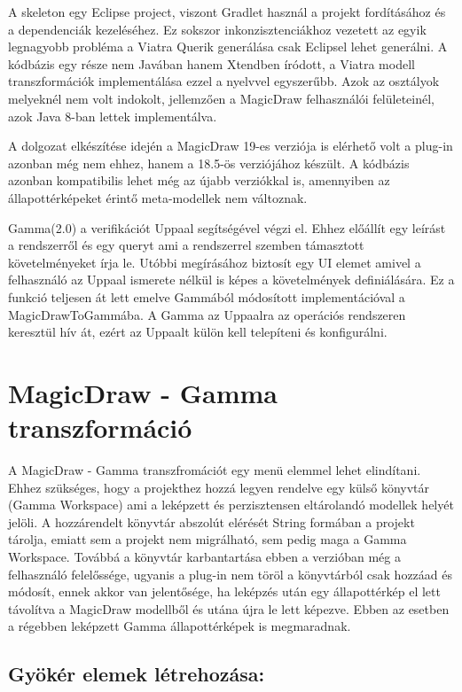 A skeleton egy Eclipse project, viszont Gradlet használ a projekt fordításához és a dependenciák kezeléséhez. Ez sokszor inkonzisztenciákhoz vezetett az egyik legnagyobb probléma a Viatra Querik generálása csak Eclipsel lehet generálni. A kódbázis egy része nem Javában hanem Xtendben íródott, a Viatra modell transzformációk implementálása ezzel a nyelvvel egyszerűbb. Azok az osztályok melyeknél nem volt indokolt, jellemzően a MagicDraw felhasználói felületeinél, azok Java 8-ban lettek implementálva.

A dolgozat elkészítése idején a MagicDraw 19-es verziója is elérhető volt a plug-in azonban még nem ehhez, hanem a 18.5-ös verziójához készült. A kódbázis azonban kompatibilis lehet még az újabb verziókkal is, amennyiben az állapottérképeket érintő meta-modellek nem változnak.

Gamma(2.0) a verifikációt Uppaal segítségével végzi el. Ehhez előállít egy leírást a rendszerről és egy queryt ami a rendszerrel szemben támasztott követelményeket írja le. Utóbbi megírásához biztosít egy UI elemet amivel a felhasználó az Uppaal ismerete nélkül is képes a követelmények definiálására. Ez a funkció teljesen át lett emelve Gammából módosított implementációval a MagicDrawToGammába. A Gamma az Uppaalra az operációs rendszeren keresztül hív át, ezért az Uppaalt külön kell telepíteni és konfigurálni.

\section{MagicDraw - Gamma transzformáció}

A MagicDraw - Gamma transzfromációt egy menü elemmel lehet elindítani. Ehhez szükséges, hogy a projekthez hozzá legyen rendelve egy külső könyvtár (Gamma Workspace) ami a leképzett és perzisztensen eltárolandó modellek helyét jelöli. A hozzárendelt könyvtár abszolút elérését String formában a projekt tárolja, emiatt sem a projekt nem migrálható, sem pedig maga a Gamma Workspace. Továbbá a könyvtár karbantartása ebben a verzióban még a felhasználó felelőssége, ugyanis a plug-in nem töröl a könyvtárból csak hozzáad és módosít, ennek akkor van jelentősége, ha leképzés után egy állapottérkép el lett távolítva a MagicDraw modellből és utána újra le lett képezve. Ebben az esetben a régebben leképzett Gamma állapottérképek is megmaradnak.

\subsection{Gyökér elemek létrehozása:}

